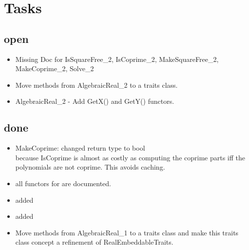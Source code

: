 
\section{Tasks}

\subsection{open}
\begin{itemize}
\item Missing Doc for IsSquareFree\_2, IsCoprime\_2, MakeSquareFree\_2,
   MakeCoprime\_2, Solve\_2
\item Move methods from AlgebraicReal\_2 to a traits class.
\item AlgebraicReal\_2 - Add GetX() and GetY() functors.
\end{itemize}

\subsection{done} 
\begin{itemize}
\item MakeCoprime: changed return type to bool\\
      because IsCoprime is almost as costly as computing the coprime
      parts iff the polynomials are not coprime. This avoids caching.  
\item all functors for  
      are documented.
\item added 
\item added  
\item Move methods from AlgebraicReal\_1 to a traits class and make
  this traits class concept a refinement of RealEmbeddableTraits.
\end{itemize}


